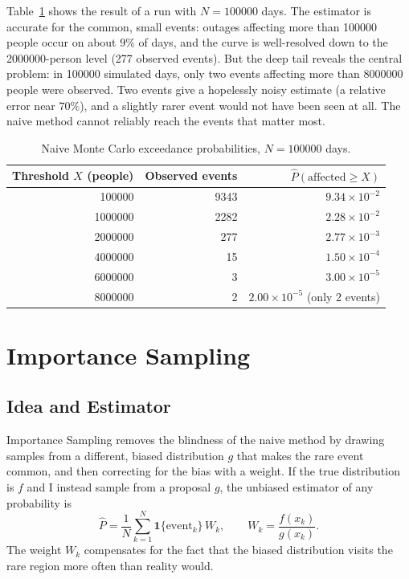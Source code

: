 \documentclass[11pt,a4paper]{article}
\begin{document}
Table~\ref{tab:naive} shows the result of a run with $N = \num{100000}$ days.
The estimator is accurate for the common, small events: outages affecting more
than \num{100000} people occur on about $9\%$ of days, and the curve is
well-resolved down to the \num{2000000}-person level (277 observed events). But
the deep tail reveals the central problem: in \num{100000} simulated days, only
two events affecting more than \num{8000000} people were observed. Two
events give a hopelessly noisy estimate (a relative error near $70\%$), and a
slightly rarer event would not have been seen at all. The naive method cannot
reliably reach the events that matter most.

\begin{table}[H]
    \centering
    \caption{Naive Monte Carlo exceedance probabilities, $N = \num{100000}$ days.}
    \label{tab:naive}
    \begin{tabular}{rrr}
        \toprule
        Threshold $X$ (people) & Observed events & $\hat{P}(\text{affected} \ge X)$ \\
        \midrule
        \num{100000}  & 9343 & $9.34\times 10^{-2}$ \\
        \num{1000000} & 2282 & $2.28\times 10^{-2}$ \\
        \num{2000000} & 277  & $2.77\times 10^{-3}$ \\
        \num{4000000} & 15   & $1.50\times 10^{-4}$ \\
        \num{6000000} & 3    & $3.00\times 10^{-5}$ \\
        \num{8000000} & 2    & $2.00\times 10^{-5}$ (only 2 events) \\
        \bottomrule
    \end{tabular}
\end{table}

\section{Importance Sampling}

\subsection{Idea and Estimator}

Importance Sampling removes the blindness of the naive method by drawing samples
from a different, biased distribution $g$ that makes the rare event common, and
then correcting for the bias with a weight. If the true distribution is $f$ and
I instead sample from a proposal $g$, the unbiased estimator of any
probability is
\begin{equation}
    \hat{P} = \frac{1}{N}\sum_{k=1}^{N} \mathbf{1}\{\text{event}_k\}\, W_k,
    \qquad W_k = \frac{f(x_k)}{g(x_k)} .
\end{equation}
The weight $W_k$ compensates for the fact that the biased distribution visits the
rare region more often than reality would.
\end{document}
